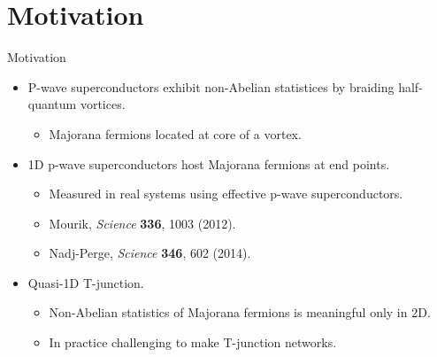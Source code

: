 \documentclass[xcolor=dvipsnames,10pt,aspectratio=169]{beamer}
\newcommand{\MO}{Motivation}
\begin{document}
  \section{\MO}
  \begin{frame}{\MO}{}

    \begin{multicols}{2}

    \begin{itemize}
      \item P-wave superconductors exhibit non-Abelian statistices by braiding half-quantum vortices.
        \begin{itemize}
          \item Majorana fermions located at core of a vortex.
        \end{itemize}
      \item 1D p-wave superconductors host Majorana fermions at end points.
        \begin{itemize}
          \item Measured in real systems using effective p-wave superconductors.
          \item Mourik, \textit{Science} \textbf{336}, 1003 (2012).
          \item Nadj-Perge, \textit{Science} \textbf{346}, 602 (2014).
        \end{itemize}
      \item Quasi-1D T-junction.
        \begin{itemize}
          \item Non-Abelian statistics of Majorana fermions is meaningful only in 2D.
          \item In practice challenging to make T-junction networks.
        \end{itemize}
    \end{itemize}

    \begin{figure}
      \end{figure}
    \end{multicols}

  \end{frame}
\end{document}
